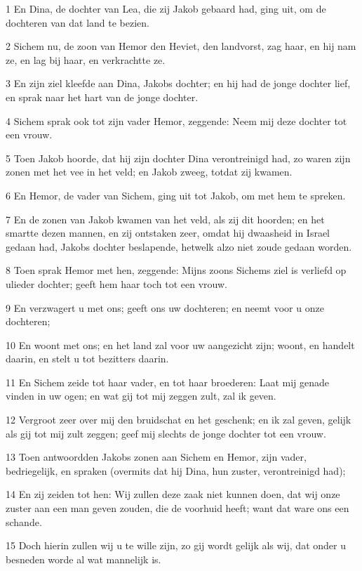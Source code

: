\par 1 En Dina, de dochter van Lea, die zij Jakob gebaard had, ging uit, om de dochteren van dat land te bezien.
\par 2 Sichem nu, de zoon van Hemor den Heviet, den landvorst, zag haar, en hij nam ze, en lag bij haar, en verkrachtte ze.
\par 3 En zijn ziel kleefde aan Dina, Jakobs dochter; en hij had de jonge dochter lief, en sprak naar het hart van de jonge dochter.
\par 4 Sichem sprak ook tot zijn vader Hemor, zeggende: Neem mij deze dochter tot een vrouw.
\par 5 Toen Jakob hoorde, dat hij zijn dochter Dina verontreinigd had, zo waren zijn zonen met het vee in het veld; en Jakob zweeg, totdat zij kwamen.
\par 6 En Hemor, de vader van Sichem, ging uit tot Jakob, om met hem te spreken.
\par 7 En de zonen van Jakob kwamen van het veld, als zij dit hoorden; en het smartte dezen mannen, en zij ontstaken zeer, omdat hij dwaasheid in Israel gedaan had, Jakobs dochter beslapende, hetwelk alzo niet zoude gedaan worden.
\par 8 Toen sprak Hemor met hen, zeggende: Mijns zoons Sichems ziel is verliefd op ulieder dochter; geeft hem haar toch tot een vrouw.
\par 9 En verzwagert u met ons; geeft ons uw dochteren; en neemt voor u onze dochteren;
\par 10 En woont met ons; en het land zal voor uw aangezicht zijn; woont, en handelt daarin, en stelt u tot bezitters daarin.
\par 11 En Sichem zeide tot haar vader, en tot haar broederen: Laat mij genade vinden in uw ogen; en wat gij tot mij zeggen zult, zal ik geven.
\par 12 Vergroot zeer over mij den bruidschat en het geschenk; en ik zal geven, gelijk als gij tot mij zult zeggen; geef mij slechts de jonge dochter tot een vrouw.
\par 13 Toen antwoordden Jakobs zonen aan Sichem en Hemor, zijn vader, bedriegelijk, en spraken (overmits dat hij Dina, hun zuster, verontreinigd had);
\par 14 En zij zeiden tot hen: Wij zullen deze zaak niet kunnen doen, dat wij onze zuster aan een man geven zouden, die de voorhuid heeft; want dat ware ons een schande.
\par 15 Doch hierin zullen wij u te wille zijn, zo gij wordt gelijk als wij, dat onder u besneden worde al wat mannelijk is.
